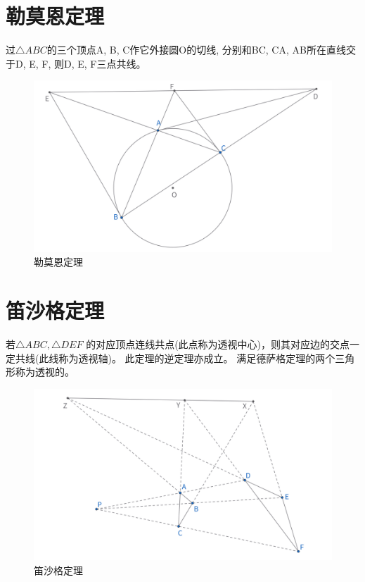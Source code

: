 \newpage
\section{勒莫恩定理}
\begin{theorem}
过$\triangle ABC$的三个顶点A, B, C作它外接圆O的切线, 分别和BC, CA, AB所在直线交于D, E, F, 则D, E, F三点共线。
\end{theorem}
\begin{figure}[H]
    \centering
    \includegraphics[width=\linewidth]{figures/勒莫恩定理.png}
    \caption{勒莫恩定理}
\end{figure}


\newpage
\section{笛沙格定理}
\begin{theorem}
若$\triangle ABC, \triangle DEF$ 的对应顶点连线共点(此点称为透视中心)，则其对应边的交点一定共线(此线称为透视轴)。
此定理的逆定理亦成立。
满足德萨格定理的两个三角形称为透视的。
\end{theorem}
\begin{figure}[H]
    \centering
    \includegraphics[width=\linewidth]{figures/笛沙格定理.png}
    \caption{笛沙格定理}
\end{figure}


